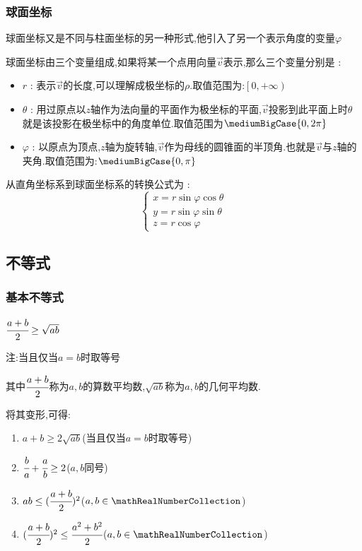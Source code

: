 {{    \subsubsection{球面坐标}{
        球面坐标又是不同与柱面坐标的另一种形式,他引入了另一个表示角度的变量$\varphi$

        球面坐标由三个变量组成,如果将某一个点用向量$\vec{v}$表示,那么三个变量分别是 :
        \begin{itemize}
            \item $r$ : 表示$\vec{v}$的长度,可以理解成极坐标的$\rho$.取值范围为:$\left[0,+\infty\right)$
            \item $\theta$ : 用过原点以$z$轴作为法向量的平面作为极坐标的平面,$\vec{v}$投影到此平面上时$\theta$就是该投影在极坐标中的角度单位.取值范围为$\mediumBigCase{0,2\pi}$
            \item $\varphi$ : 以原点为顶点,$z$轴为旋转轴,$\vec{v}$作为母线的圆锥面的半顶角.也就是$\vec{v}$与$z$轴的夹角.取值范围为:$\mediumBigCase{0,\pi}$
        \end{itemize}

        从直角坐标系到球面坐标系的转换公式为 :
        $$
            \begin{cases}
                x = r\sin\varphi\cos\theta \\
                y = r\sin\varphi\sin\theta \\
                z = r\cos\varphi
            \end{cases}
        $$
    }%

}%

\subsection{不等式}{

\subsubsection{基本不等式}{
    $\cfrac{a + b}{2} \geq \sqrt{ab}$

    注:当且仅当$a = b$时取等号

    其中$\cfrac{a+b}{2}$称为$a,b$的算数平均数,$\sqrt{ab}$称为$a,b$的几何平均数.

    将其变形,可得:
    \begin{enumerate}
        \item $a + b \geq 2\sqrt{ab}$(当且仅当$a = b$时取等号)
        \item $\cfrac{b}{a} + \cfrac{a}{b} \geq 2$($a,b$同号)
        \item $ab \leq (\cfrac{a + b}{2})^2$($a,b\in\mathRealNumberCollection$)
        \item $(\cfrac{a + b}{2})^2 \leq \cfrac{a^2 + b^2}{2}$($a,b\in\mathRealNumberCollection$)
    \end{enumerate}
}%


}}
